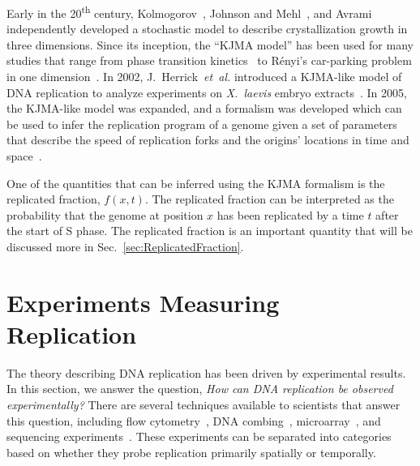 	Early in the 20\textsuperscript{th} century, Kolmogorov~\cite{Kolmogorov}, Johnson and Mehl~\cite{JohnsonAndMehl}, and Avrami~\cite{AvramiI,AvramiII,AvramiIII} independently developed a stochastic model to describe crystallization growth in three dimensions.
	Since its inception, the ``KJMA model'' has been used for many studies that range from phase transition kinetics~\cite{AlloyPhaseTransitions} to R{\'e}nyi's car-parking problem in one dimension~\cite{CarParking}.
	In 2002, J.~Herrick~\emph{et~al.} introduced a KJMA-like model of DNA replication to analyze experiments on \emph{X.~laevis} embryo extracts~\cite{KJMA2002}.
	In 2005, the KJMA-like model was expanded, and a formalism was developed which can be used to infer the replication program of a genome given a set of parameters that describe the speed of replication forks and the origins' locations in time and space~\cite{KJMA1, KJMA2}.
	
	One of the quantities that can be inferred using the KJMA formalism is the replicated fraction, $f(x,t)$.
	The replicated fraction can be interpreted as the probability that the genome at position $x$ has been replicated by a time $t$ after the start of S phase.
	The replicated fraction is an important quantity that will be discussed more in Sec.~\ref{sec:ReplicatedFraction}.
	
	
	\section{Experiments Measuring Replication}
	\label{sec:ExperimentsBasics}
	
	The theory describing DNA replication has been driven by experimental results.
	In this section, we answer the question, \emph{How can DNA replication be observed experimentally?}
	There are several techniques available to scientists that answer this question, including flow cytometry~\cite{DeepSeq}, DNA combing~\cite{DNACombing}, microarray~\cite{MicroarrayReview, McCuneMicroArray}, and sequencing experiments~\cite{StochasticTermination,DeepSeq}.
	These experiments can be separated into categories based on whether they probe replication primarily spatially or temporally.
	
